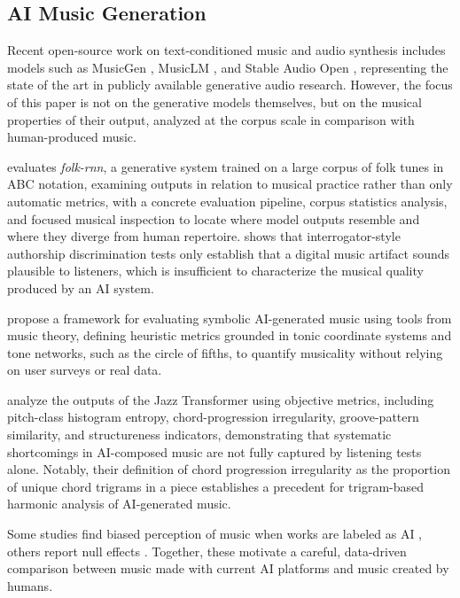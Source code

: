 \documentclass{article}
\begin{document}
\subsection{AI Music Generation}
Recent open-source work on text-conditioned music and audio synthesis includes models such as MusicGen \citep{copet2023simple}, MusicLM \citep{agostinelli2023musiclm}, and Stable Audio Open \citep{evans2025stable}, representing the state of the art in publicly available generative audio research. However, the focus of this paper is not on the generative models themselves, but on the musical properties of their output, analyzed at the corpus scale in comparison with human-produced music.

\citet{Sturm2016c} evaluates \textit{folk-rnn}, a generative system trained on a large corpus of folk tunes in ABC notation, examining outputs in relation to musical practice rather than only automatic metrics, with a concrete evaluation pipeline, corpus statistics analysis, and focused musical inspection to locate where model outputs resemble and where they diverge from human repertoire. \citet{Ariza2009a} shows that interrogator-style authorship discrimination tests only establish that a digital music artifact sounds plausible to listeners, which is insufficient to characterize the musical quality produced by an AI system.

\citet{dervakos2021heuristics} propose a framework for evaluating symbolic AI-generated music using tools from music theory, defining heuristic metrics grounded in tonic coordinate systems and tone networks, such as the circle of fifths, to quantify musicality without relying on user surveys or real data.

\citet{wu2020jazz} analyze the outputs of the Jazz Transformer using objective metrics, including pitch-class histogram entropy, chord-progression irregularity, groove-pattern similarity, and structureness indicators, demonstrating that systematic shortcomings in AI-composed music are not fully captured by listening tests alone. Notably, their definition of chord progression irregularity as the proportion of unique chord trigrams in a piece establishes a precedent for trigram-based harmonic analysis of AI-generated music.

Some studies find biased perception of music when works are labeled as AI \citep{Ragot2020t,Shank2022q,Deguernel2023a}, others report null effects \citep{Pasquier2016a,Zlatkov2023a}. Together, these motivate a careful, data-driven comparison between music made with current AI platforms and music created by humans.
\end{document}
